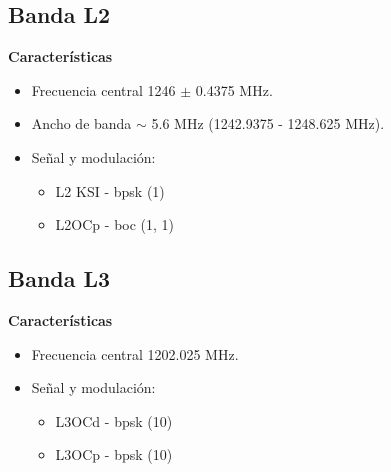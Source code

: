 \subsection{Banda L2}

\begin{justify}
    \textbf{Características}
    \begin{itemize}
        \item Frecuencia central 1246 $\pm$ 0.4375 MHz.
        \item Ancho de banda \( \sim \) 5.6 MHz (1242.9375 - 1248.625 MHz).
        \item Señal y modulación:
        \begin{itemize}
            \item L2 KSI - \gls{bpsk} (1)
            \item L2OCp - \gls{boc} (1, 1)
        \end{itemize}
    \end{itemize}
\end{justify}

\subsection{Banda L3}

\begin{justify}
    \textbf{Características}
    \begin{itemize}
        \item Frecuencia central 1202.025 MHz.
        \item Señal y modulación:
        \begin{itemize}
            \item L3OCd - \gls{bpsk} (10)
            \item L3OCp - \gls{bpsk} (10)
        \end{itemize}
    \end{itemize}
\end{justify}